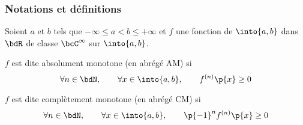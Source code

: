 \documentclass[a4paper,french,bookmarks]{article}
\begin{document}
    \renewcommand{\thesection}{\Roman{section}}
    \renewcommand{\thesection}{Partie \Roman{section}}
    \renewcommand{\labelenumi}{\Roman{section}.\arabic{enumi}.}
    \renewcommand*{\labelenumii}{\alph{enumii}.}

    
    \subsubsection*{Notations et définitions}
    
    \begin{enumerate}
        \itt Soient $a$ et $b$ tels que $- \infty \leq a < b \leq +\infty$ et $f$ une fonction de $\into{a, b}$ dans $\bdR$ de classe $\bcC^\infty$ sur $\into{a, b}$.
        
        \itt $f$ est dite absolument monotone (en abrégé AM) si
        \[ \forall n \in \bdN,\qquad \forall x \in \into{a, b},\qquad f^{(n)}\p{x} \geq 0\]
        
        \itt $f$ est dite complètement monotone (en abrégé CM) si
        \[ \forall n \in \bdN,\qquad \forall x \in \into{a,b},\qquad \p{-1}^nf^{(n)}\p{x} \geq 0\]
    \end{enumerate}
    
    \section{}
    
\end{document}
